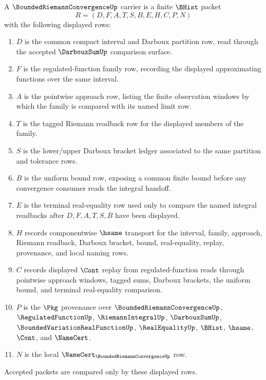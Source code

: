 \begin{definition}
\label{def:bounded-riemann-convergence-carrier}
A $\BoundedRiemannConvergenceUp$ carrier is a finite $\BHist$ packet
$$
R=(D,F,A,T,S,B,E,H,C,P,N)
$$
with the following displayed rows:
\begin{enumerate}
\item $D$ is the common compact interval and Darboux partition row, read through the accepted $\DarbouxSumUp$ comparison surface.
\item $F$ is the regulated-function family row, recording the displayed approximating functions over the same interval.
\item $A$ is the pointwise approach row, listing the finite observation windows by which the family is compared with its named limit row.
\item $T$ is the tagged Riemann readback row for the displayed members of the family.
\item $S$ is the lower/upper Darboux bracket ledger associated to the same partition and tolerance rows.
\item $B$ is the uniform bound row, exposing a common finite bound before any convergence consumer reads the integral handoff.
\item $E$ is the terminal real-equality row used only to compare the named integral readbacks after $D,F,A,T,S,B$ have been displayed.
\item $H$ records componentwise $\hsame$ transport for the interval, family, approach, Riemann readback, Darboux bracket, bound, real-equality, replay, provenance, and local naming rows.
\item $C$ records displayed $\Cont$ replay from regulated-function reads through pointwise approach windows, tagged sums, Darboux brackets, the uniform bound, and terminal real-equality comparison.
\item $P$ is the $\Pkg$ provenance over $\BoundedRiemannConvergenceUp$, $\RegulatedFunctionUp$, $\RiemannIntegralUp$, $\DarbouxSumUp$, $\BoundedVariationRealFunctionUp$, $\RealEqualityUp$, $\BHist$, $\hsame$, $\Cont$, and $\NameCert$.
\item $N$ is the local $\NameCert_{\BoundedRiemannConvergenceUp}$ row.
\end{enumerate}
Accepted packets are compared only by these displayed rows.
\end{definition}

